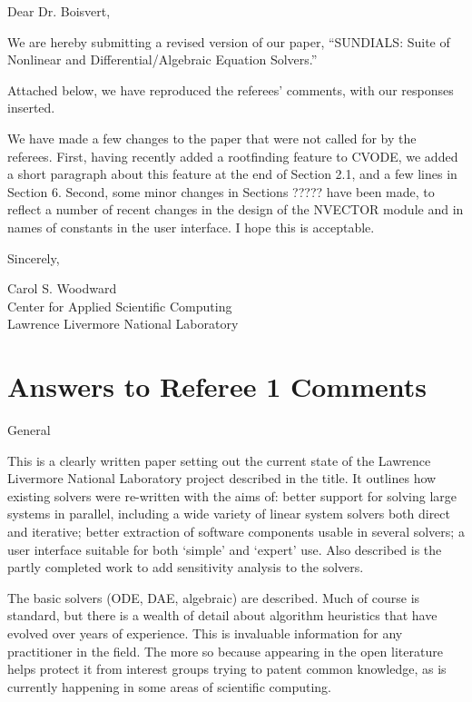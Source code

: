 \documentclass[12pt]{letter}
\begin{document}
\begin{letter}



\opening{Dear Dr. Boisvert,}

We are hereby submitting a revised version of our paper, ``SUNDIALS:
Suite of Nonlinear and Differential/Algebraic Equation Solvers.''

Attached below, we have reproduced the referees' comments, with our
responses inserted.

We have made a few changes to the paper that were not called for by the
referees.  First, having recently added a rootfinding feature to CVODE, we
added a short paragraph about this feature at the end of Section 2.1,
and a few lines in Section 6.  Second, some minor changes in Sections
????? have been made, to reflect a number of recent changes in the
design of the NVECTOR module and in names of constants in the user
interface.  I hope this is acceptable.


\closing{Sincerely,}

Carol S. Woodward\\
Center for Applied Scientific Computing\\
Lawrence Livermore National Laboratory

\end{letter}


\newpage
\section{Answers to Referee 1 Comments}

General

This is a clearly written paper setting out the current state of the
Lawrence Livermore National Laboratory project described in the title.
It outlines how existing solvers were re-written with the aims of:
better support for solving large systems in parallel, including a wide
variety of linear system solvers both direct and iterative; better
extraction of software components usable in several solvers; a user
interface suitable for both `simple' and `expert' use. Also described
is the partly completed work to add sensitivity analysis to the
solvers.

The basic solvers (ODE, DAE, algebraic) are described.  Much of course
is standard, but there is a wealth of detail about algorithm
heuristics that have evolved over years of experience. This is
invaluable information for any practitioner in the field. The more so
because appearing in the open literature helps protect it from
interest groups trying to patent common knowledge, as is currently
happening in some areas of scientific computing.
\end{document}
